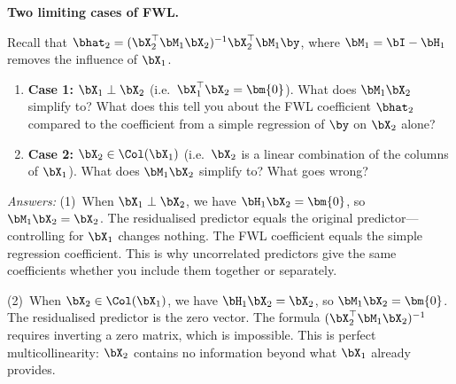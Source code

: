 
\begin{stopandthink}
\textbf{Two limiting cases of FWL.}

Recall that $\bhat_2 = (\bX_2^\top \bM_1 \bX_2)^{-1}\bX_2^\top \bM_1 \by$,
where $\bM_1 = \bI - \bH_1$ removes the influence of $\bX_1$.
\begin{enumerate}[nosep]
  \item \textbf{Case 1:} $\bX_1 \perp \bX_2$
    (i.e.\ $\bX_1^\top \bX_2 = \bm{0}$).
    What does $\bM_1 \bX_2$ simplify to?
    What does this tell you about the FWL coefficient $\bhat_2$
    compared to the coefficient from a simple regression of $\by$ on $\bX_2$ alone?
  \item \textbf{Case 2:} $\bX_2 \in \Col(\bX_1)$
    (i.e.\ $\bX_2$ is a linear combination of the columns of $\bX_1$).
    What does $\bM_1 \bX_2$ simplify to?
    What goes wrong?
\end{enumerate}
\emph{Answers:}
(1)~When $\bX_1 \perp \bX_2$, we have $\bH_1 \bX_2 = \bm{0}$, so
$\bM_1 \bX_2 = \bX_2$. The residualised predictor equals the original
predictor---controlling for $\bX_1$ changes nothing.
The FWL coefficient equals the simple regression coefficient.
This is why uncorrelated predictors give the same coefficients whether
you include them together or separately.

(2)~When $\bX_2 \in \Col(\bX_1)$, we have $\bH_1 \bX_2 = \bX_2$, so
$\bM_1 \bX_2 = \bm{0}$. The residualised predictor is the zero vector.
The formula $(\bX_2^\top \bM_1 \bX_2)^{-1}$ requires inverting a zero matrix,
which is impossible.
This is perfect multicollinearity: $\bX_2$ contains no information
beyond what $\bX_1$ already provides.
\end{stopandthink}



